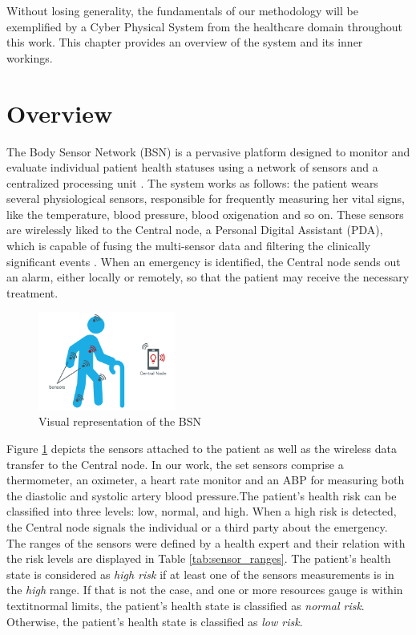 Without losing generality, the fundamentals of our methodology will be exemplified by a Cyber Physical System from the healthcare domain throughout this work. This chapter provides an overview of the system and its inner workings.

\section{Overview}

The Body Sensor Network (BSN) \cite{pessoa2017building} is a pervasive platform designed to monitor and evaluate individual patient health statuses using a network of sensors and a centralized processing unit \cite{2021BSN}. The system works as follows: the patient wears several physiological sensors, responsible for frequently measuring her vital signs, like the temperature, blood pressure, blood oxigenation and so on. These sensors are wirelessly liked to the Central node, a Personal Digital Assistant (PDA), which is capable of fusing the multi-sensor data and filtering the clinically significant  events \cite{lo2005body}. When an emergency is identified, the Central node sends out an alarm, either locally or remotely, so that the patient may receive the necessary treatment. 

\begin{figure}[!h]
	\centering
	\includegraphics[width=0.4\textwidth, keepaspectratio]{img/BSN-overview.png}
	\caption{Visual representation of the BSN}
	\label{fig:BSN-overview}
\end{figure}

Figure \ref{fig:BSN-overview} depicts the sensors attached to the patient as well as the wireless data transfer to the Central node. In our work, the set sensors comprise a thermometer, an oximeter, a heart rate monitor and an ABP for measuring both the diastolic and systolic artery blood pressure.The patient's health risk can be classified into three levels: low, normal, and high. When a high risk is detected, the Central node signals the individual or a third party about the emergency. The ranges of the sensors were defined by a health expert \cite{pessoa2017building} and their relation with the risk levels are displayed in Table \ref{tab:sensor_ranges}. The patient's health state is considered as \textit{high risk} if at least one of the sensors measurements is in the \textit{high} range. If that is not the case, and one or more resources gauge is within textit{normal} limits, the patient's health state is classified as \textit{normal risk}. Otherwise, the patient's health state is classified as \textit{low risk}.

